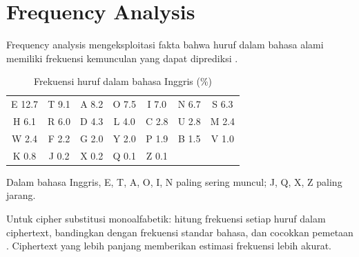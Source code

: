 \section{Frequency Analysis}

Frequency analysis mengeksploitasi fakta bahwa huruf dalam bahasa alami memiliki frekuensi kemunculan yang dapat diprediksi \cite{trappe2006,schneier1996}.

\begin{table}[!htbp]
\centering
\caption{Frekuensi huruf dalam bahasa Inggris (\%)}
\label{tab:frequency}
\begin{tabular}{@{}*{7}{c}@{}}
\toprule
E 12.7 & T 9.1 & A 8.2 & O 7.5 & I 7.0 & N 6.7 & S 6.3 \\
H 6.1 & R 6.0 & D 4.3 & L 4.0 & C 2.8 & U 2.8 & M 2.4 \\
W 2.4 & F 2.2 & G 2.0 & Y 2.0 & P 1.9 & B 1.5 & V 1.0 \\
K 0.8 & J 0.2 & X 0.2 & Q 0.1 & Z 0.1 & & \\
\bottomrule
\end{tabular}
\end{table}

Dalam bahasa Inggris, E, T, A, O, I, N paling sering muncul; J, Q, X, Z paling jarang.

Untuk cipher substitusi monoalfabetik: hitung frekuensi setiap huruf dalam ciphertext, bandingkan dengan frekuensi standar bahasa, dan cocokkan pemetaan \cite{trappe2006,schneier1996}. Ciphertext yang lebih panjang memberikan estimasi frekuensi lebih akurat.

